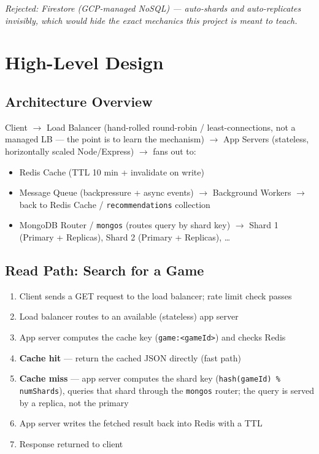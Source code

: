 \documentclass[11pt]{article}
\begin{document}
\textit{Rejected: Firestore (GCP-managed NoSQL) --- auto-shards and auto-replicates invisibly, which would hide the exact mechanics this project is meant to teach.}

\section{High-Level Design}

\subsection{Architecture Overview}

Client $\rightarrow$ Load Balancer (hand-rolled round-robin / least-connections, not a managed LB --- the point is to learn the mechanism) $\rightarrow$ App Servers (stateless, horizontally scaled Node/Express) $\rightarrow$ fans out to:

\begin{itemize}[nosep]
    \item Redis Cache (TTL 10 min + invalidate on write)
    \item Message Queue (backpressure + async events) $\rightarrow$ Background Workers $\rightarrow$ back to Redis Cache / \texttt{recommendations} collection
    \item MongoDB Router / \texttt{mongos} (routes query by shard key) $\rightarrow$ Shard 1 (Primary + Replicas), Shard 2 (Primary + Replicas), \ldots
\end{itemize}

\subsection{Read Path: Search for a Game}

\begin{enumerate}[nosep]
    \item Client sends a GET request to the load balancer; rate limit check passes
    \item Load balancer routes to an available (stateless) app server
    \item App server computes the cache key (\texttt{game:<gameId>}) and checks Redis
    \item \textbf{Cache hit} --- return the cached JSON directly (fast path)
    \item \textbf{Cache miss} --- app server computes the shard key (\texttt{hash(gameId) \% numShards}), queries that shard through the \texttt{mongos} router; the query is served by a replica, not the primary
    \item App server writes the fetched result back into Redis with a TTL
    \item Response returned to client
\end{enumerate}
\end{document}

